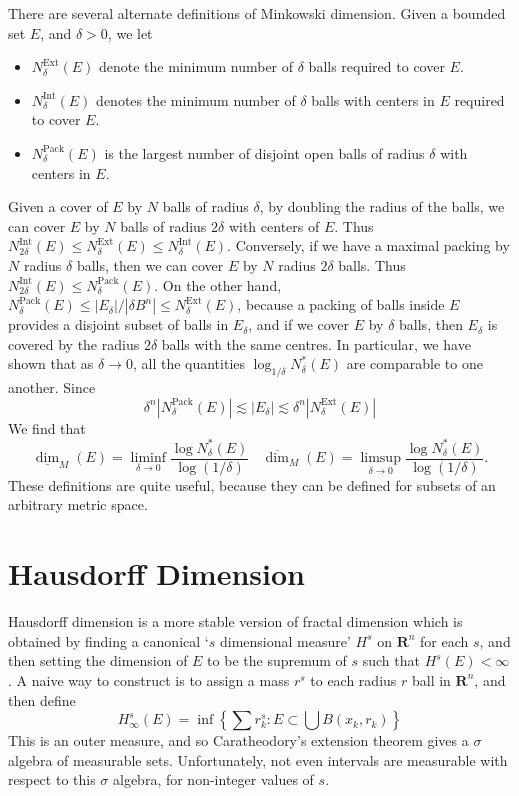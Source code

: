 There are several alternate definitions of Minkowski dimension. Given a bounded set $E$, and $\delta > 0$, we let
%
\begin{itemize}
	\item $N^\text{Ext}_\delta(E)$ denote the minimum number of $\delta$ balls required to cover $E$.
	\item $N^\text{Int}_\delta(E)$ denotes the minimum number of $\delta$ balls with centers in $E$ required to cover $E$.
	\item $N^\text{Pack}_\delta(E)$ is the largest number of disjoint open balls of radius $\delta$ with centers in $E$.
\end{itemize}
%
Given a cover of $E$ by $N$ balls of radius $\delta$, by doubling the radius of the balls, we can cover $E$ by $N$ balls of radius $2\delta$ with centers of $E$. Thus $N^\text{Int}_{2\delta}(E) \leq N^\text{Ext}_\delta(E) \leq N^{\text{Int}}_\delta(E)$. Conversely, if we have a maximal packing by $N$ radius $\delta$ balls, then we can cover $E$ by $N$ radius $2\delta$ balls. Thus $N^\text{Int}_{2\delta}(E) \leq N^\text{Pack}_\delta(E)$. On the other hand, $N^\text{Pack}_\delta(E) \leq |E_\delta|/|\delta B^n| \leq N_\delta^\text{Ext}(E)$, because a packing of balls inside $E$ provides a disjoint subset of balls in $E_\delta$, and if we cover $E$ by $\delta$ balls, then $E_\delta$ is covered by the radius $2\delta$ balls with the same centres. In particular, we have shown that as $\delta \to 0$, all the quantities $\log_{1/\delta} N^*_\delta(E)$ are comparable to one another. Since
%
\[ \delta^n |N_\delta^{\text{Pack}}(E)| \lesssim |E_\delta| \lesssim \delta^n |N_\delta^{\text{Ext}}(E)| \]
%
We find that
%
\[ \underline{\dim}_M(E) = \liminf_{\delta \to 0} \frac{\log N_\delta^*(E)}{\log(1/\delta)}\ \ \ \ \overline{\dim}_M(E) = \limsup_{\delta \to 0} \frac{\log N_\delta^*(E)}{\log(1/\delta)}. \]
%
These definitions are quite useful, because they can be defined for subsets of an arbitrary metric space.

\section{Hausdorff Dimension}

Hausdorff dimension is a more stable version of fractal dimension which is obtained by finding a canonical `$s$ dimensional measure' $H^s$ on $\mathbf{R}^n$ for each $s$, and then setting the dimension of $E$ to be the supremum of $s$ such that $H^s(E) < \infty$. A naive way to construct is to assign a mass $r^s$ to each radius $r$ ball in $\mathbf{R}^n$, and then define
%
\[ H^s_\infty(E) = \inf \left\{ \sum r_k^s : E \subset \bigcup B(x_k,r_k) \right\} \]
%
This is an outer measure, and so Caratheodory's extension theorem gives a $\sigma$ algebra of measurable sets. Unfortunately, not even intervals are measurable with respect to this $\sigma$ algebra, for non-integer values of $s$.

